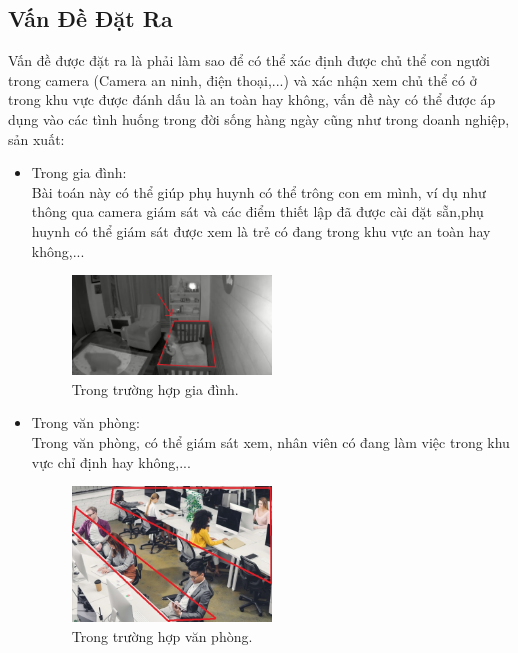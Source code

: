 \begin{flushleft}
    \subsection{Vấn Đề Đặt Ra}
    \fontsize{13}{20}\selectfont Vấn đề được đặt ra là phải làm sao để có thể xác định được chủ thể con người trong camera (Camera an ninh, điện thoại,...) và xác nhận xem chủ thể có ở trong khu vực được đánh dấu là an toàn hay không, vấn đề này có thể được áp dụng vào các tình huống trong đời sống hàng ngày cũng như trong doanh nghiệp, sản xuất:\\ 
    \begin{itemize}
        \item Trong gia đình: \\
        Bài toán này có thể giúp phụ huynh có thể trông con em mình, ví dụ như thông qua camera giám sát và các điểm thiết lập đã được cài đặt sẵn,phụ huynh có thể giám sát được xem là trẻ có đang trong khu vực an toàn hay không,...
        \begin{figure}[htbp]
            \centering
            \includegraphics[width=0.5\textwidth]{images/TH1.jpg}
            \caption{Trong trường hợp gia đình.}
            \label{fig:img_1_GD}
        \end{figure}
        \item Trong văn phòng:\\
        Trong văn phòng, có thể giám sát xem, nhân viên có đang làm việc trong khu vực chỉ định hay không,...
        \begin{figure}[htbp]
            \centering
            \includegraphics[width=0.5\textwidth]{images/TH2.jpg}
            \caption{Trong trường hợp văn phòng.}
            \label{fig:img_2_VP}
        \end{figure}

\end{itemize}
\end{flushleft}
